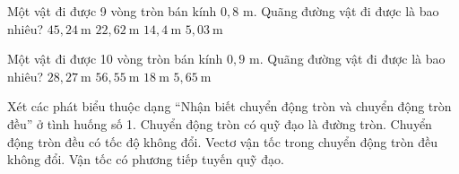 \begin{ex}
Một vật đi được 9 vòng tròn bán kính $0,8$ m. Quãng đường vật đi được là bao nhiêu?
\choice
{\True $45,24\ \mathrm{m}$}
{$22,62\ \mathrm{m}$}
{$14,4\ \mathrm{m}$}
{$5,03\ \mathrm{m}$}
\end{ex}

\begin{ex}
Một vật đi được 10 vòng tròn bán kính $0,9$ m. Quãng đường vật đi được là bao nhiêu?
\choice
{$28,27\ \mathrm{m}$}
{\True $56,55\ \mathrm{m}$}
{$18\ \mathrm{m}$}
{$5,65\ \mathrm{m}$}
\end{ex}

\begin{ex}
Xét các phát biểu thuộc dạng “Nhận biết chuyển động tròn và chuyển động tròn đều” ở tình huống số 1.
\choiceTF
{\True Chuyển động tròn có quỹ đạo là đường tròn.}
{\True Chuyển động tròn đều có tốc độ không đổi.}
{Vectơ vận tốc trong chuyển động tròn đều không đổi.}
{\True Vận tốc có phương tiếp tuyến quỹ đạo.}
\end{ex}

